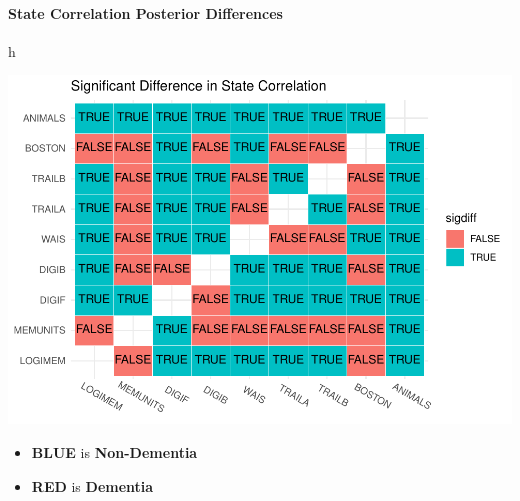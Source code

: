 \documentclass[
]{article}
\providecommand{\tightlist}{%
  \setlength{\itemsep}{0pt}\setlength{\parskip}{0pt}}
\begin{document}
\hypertarget{state-correlation-posterior-differences}{%
\paragraph{State Correlation Posterior Differences}\label{state-correlation-posterior-differences}}

h

\includegraphics{DataAnalysis_files/figure-latex/unnamed-chunk-7-1.pdf}

\begin{itemize}
\tightlist
\item
  \textbf{BLUE} is \textbf{Non-Dementia}
\item
  \textbf{RED} is \textbf{Dementia}
\end{itemize}
\end{document}

